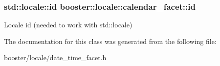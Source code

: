 \subsubsection[{id}]{\setlength{\rightskip}{0pt plus 5cm}std\-::locale\-::id booster\-::locale\-::calendar\-\_\-facet\-::id\hspace{0.3cm}{\ttfamily [static]}}\label{classbooster_1_1locale_1_1calendar__facet_a0879444f636f6520c74e2abb4615f53f}
Locale id (needed to work with std\-::locale) 

The documentation for this class was generated from the following file\-:\begin{DoxyCompactItemize}
\item 
booster/locale/date\-\_\-time\-\_\-facet.\-h\end{DoxyCompactItemize}
